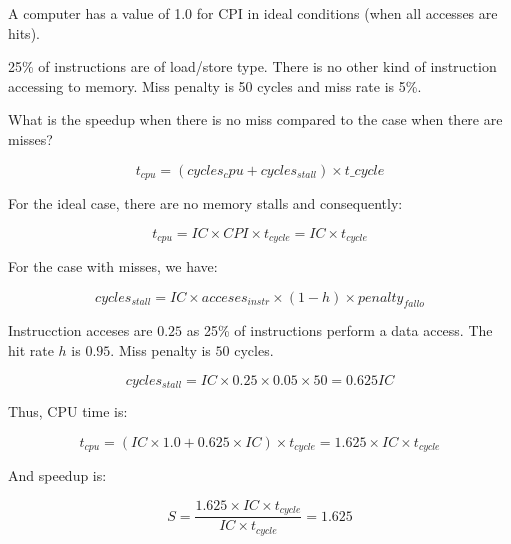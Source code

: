 \begin{acexercise}\end{acexercise}

A computer has a value of 1.0 for CPI in ideal conditions
(when all accesses are hits).

25\% of instructions are of load/store type.
There is no other kind of instruction accessing to memory.
Miss penalty is 50 cycles and miss rate is 5\%.

What is the speedup when there is no miss compared to the case
when there are misses?

\begin{acsolution}\end{acsolution}

\[
t_{cpu} = (cycles_cpu + cycles_{stall}) \times t\_{cycle}
\]

For the ideal case, there are no memory stalls and consequently:

\[
t_{cpu} = IC \times CPI \times t_{cycle} =
IC \times t_{cycle}
\]

For the case with misses, we have:

\[
cycles_{stall} =
IC \times acceses_{instr} \times (1 - h) \times {penalty}_{fallo}
\]

Instrucction acceses are $0.25$ as 25\% of instructions perform a data access.
The hit rate $h$ is $0.95$.
Miss penalty is $50$ cycles.

\[
cycles_{stall} =
IC \times 0.25 \times 0.05 \times 50 =
0.625 IC
\]

Thus, CPU time is:

\[
t_{cpu} = (IC \times 1.0 + 0.625 \times IC) \times t_{cycle} =
1.625 \times IC \times t_{cycle}
\]

And speedup is:

\[
S = \frac{1.625 \times IC \times t_{cycle}}{IC \times t_{cycle}} = 1.625
\]
